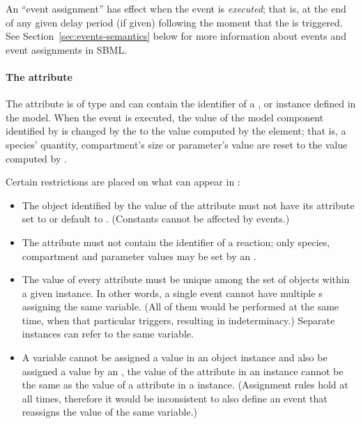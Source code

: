 An ``event assignment'' has effect when the event is
\emph{executed}; that is, at the end of any given delay period (if
given) following the moment that the \Event is triggered.  See
Section~\ref{sec:events-semantics} below for more information
about events and event assignments in SBML.


\paragraph{The  attribute}

The  attribute is of type  and can
contain the identifier of a \Compartment, \Species or \Parameter
instance defined in the model.  When the event is executed, the value of
the model component identified by  is changed by
the \EventAssignment to the value computed by the 
element; that is, a species' quantity, compartment's size or
parameter's value are reset to the value computed by .

Certain restrictions are placed on what can appear in
:
\begin{itemize}
  
\item The object identified by the value of the 
  attribute must not have its  attribute set to or default
  to .  (Constants cannot be affected by events.)
  
\item The  attribute must not contain the identifier
  of a reaction; only species, compartment and parameter values
  may be set by an \Event.
  
\item The value of every  attribute must be unique
  among the set of \EventAssignment objects within a given
  \Event instance.  In other words, a single event cannot have
  multiple \EventAssignment{}s assigning the same variable.  (All
  of them would be performed at the same time, when that
  particular \Event triggers, resulting in indeterminacy.)
  Separate \Event instances can refer to the same variable.
  
\item A variable cannot be assigned a value in an \EventAssignment
  object instance and also be assigned a value by an
  \AssignmentRule, \ie the value of the  attribute
  in an \EventAssignment instance cannot be the same as the value
  of a  attribute in a \AssignmentRule instance.
  (Assignment rules hold at all times, therefore it would be
  inconsistent to also define an event that reassigns the value of
  the same variable.)

\end{itemize}



